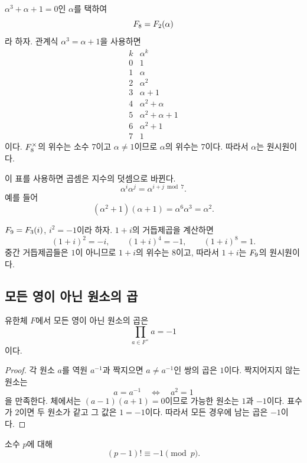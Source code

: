 \begin{example}
$\alpha^3+\alpha+1=0$인 $\alpha$를 택하여
\[
  F_8=F_2(\alpha)
\]
라 하자. 관계식 $\alpha^3=\alpha+1$을 사용하면
\[
\begin{array}{c|c}
 k & \alpha^k\\
\hline
0&1\\
1&\alpha\\
2&\alpha^2\\
3&\alpha+1\\
4&\alpha^2+\alpha\\
5&\alpha^2+\alpha+1\\
6&\alpha^2+1\\
7&1
\end{array}
\]
이다. $F_8^\times$의 위수는 소수 $7$이고 $\alpha\ne1$이므로 $\alpha$의 위수는 $7$이다. 따라서 $\alpha$는 원시원이다.

이 표를 사용하면 곱셈은 지수의 덧셈으로 바뀐다.
\[
  \alpha^i\alpha^j=\alpha^{i+j\bmod7}.
\]
예를 들어
\[
  (\alpha^2+1)(\alpha+1)=\alpha^6\alpha^3=\alpha^2.
\]
\end{example}

\begin{example}[아홉 원소 체]
$F_9=F_3(i)$, $i^2=-1$이라 하자. $1+i$의 거듭제곱을 계산하면
\[
  (1+i)^2=-i,
  \qquad
  (1+i)^4=-1,
  \qquad
  (1+i)^8=1.
\]
중간 거듭제곱들은 $1$이 아니므로 $1+i$의 위수는 $8$이고, 따라서 $1+i$는 $F_9$의 원시원이다.
\end{example}

\subsection{모든 영이 아닌 원소의 곱}

\begin{proposition}
유한체 $F$에서 모든 영이 아닌 원소의 곱은
\[
  \prod_{a\in F^\times}a=-1
\]
이다.
\end{proposition}

\begin{proof}
각 원소 $a$를 역원 $a^{-1}$과 짝지으면 $a\ne a^{-1}$인 쌍의 곱은 $1$이다. 짝지어지지 않는 원소는
\[
  a=a^{-1}
  \quad\Longleftrightarrow\quad
  a^2=1
\]
을 만족한다. 체에서는 $(a-1)(a+1)=0$이므로 가능한 원소는 $1$과 $-1$이다. 표수가 $2$이면 두 원소가 같고 그 값은 $1=-1$이다. 따라서 모든 경우에 남는 곱은 $-1$이다.
\end{proof}

\begin{corollary}[윌슨 정리]
소수 $p$에 대해
\[
  (p-1)!\equiv-1\pmod p.
\]
\end{corollary}

